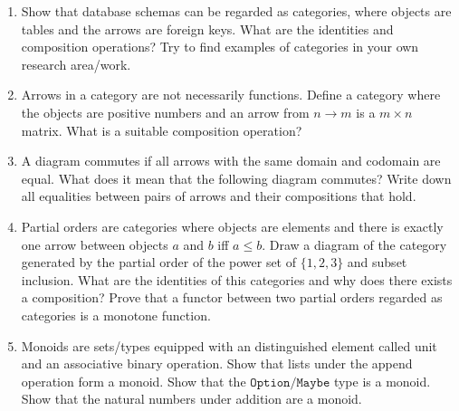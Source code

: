\documentclass{scrartcl}
\begin{document}
\begin{enumerate}

\item
  Show that database schemas can be regarded as categories, where
  objects are tables and the arrows are foreign keys.  What are the
  identities and composition operations?  Try to find examples of
  categories in your own research area/work.

\item \label{ex:matrix} Arrows in a category are not necessarily
  functions.  Define a category where the objects are positive numbers
  and an arrow from $n \rightarrow m$ is a $m \times n$ matrix.  What
  is a suitable composition operation?

\item
  A diagram commutes if all arrows with the same domain and codomain
  are equal.  What does it mean that the following diagram commutes?
  Write down all equalities between pairs of arrows and their
  compositions that hold.
  \begin{center}
  \end{center}

\item
  Partial orders are categories where objects are elements and there
  is exactly one arrow between objects $a$ and $b$ iff $a \leq b$.
  Draw a diagram of the category generated by the partial order of the
  power set of $\{1,2,3\}$ and subset inclusion.  What are the
  identities of this categories and why does there exists a
  composition?  Prove that a functor between two partial orders
  regarded as categories is a monotone function.

\item
  Monoids are sets/types equipped with an distinguished element called
  unit and an associative binary operation.
  Show that lists under the append operation form a monoid.
  Show that the $\mathtt{Option}/\mathtt{Maybe}$ type is a monoid.
  Show that the natural numbers under addition are a monoid.


\end{enumerate}
\end{document}
